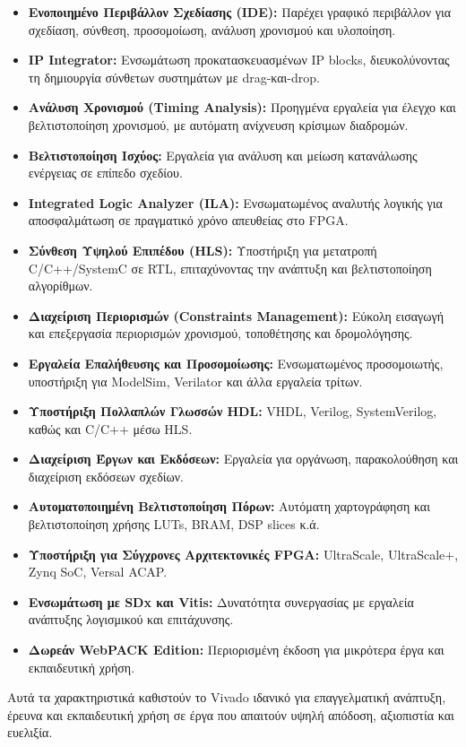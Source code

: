 \begin{itemize}
  \item \textbf{Ενοποιημένο Περιβάλλον Σχεδίασης (IDE):} Παρέχει γραφικό περιβάλλον για σχεδίαση, σύνθεση, προσομοίωση, ανάλυση χρονισμού και υλοποίηση.
  \item \textbf{IP Integrator:} Ενσωμάτωση προκατασκευασμένων IP blocks, διευκολύνοντας τη δημιουργία σύνθετων συστημάτων με drag-και-drop.
  \item \textbf{Ανάλυση Χρονισμού (Timing Analysis):} Προηγμένα εργαλεία για έλεγχο και βελτιστοποίηση χρονισμού, με αυτόματη ανίχνευση κρίσιμων διαδρομών.
  \item \textbf{Βελτιστοποίηση Ισχύος:} Εργαλεία για ανάλυση και μείωση κατανάλωσης ενέργειας σε επίπεδο σχεδίου.
  \item \textbf{Integrated Logic Analyzer (ILA):} Ενσωματωμένος αναλυτής λογικής για αποσφαλμάτωση σε πραγματικό χρόνο απευθείας στο FPGA.
  \item \textbf{Σύνθεση Υψηλού Επιπέδου (HLS):} Υποστήριξη για μετατροπή C/C++/SystemC σε RTL, επιταχύνοντας την ανάπτυξη και βελτιστοποίηση αλγορίθμων.
  \item \textbf{Διαχείριση Περιορισμών (Constraints Management):} Εύκολη εισαγωγή και επεξεργασία περιορισμών χρονισμού, τοποθέτησης και δρομολόγησης.
  \item \textbf{Εργαλεία Επαλήθευσης και Προσομοίωσης:} Ενσωματωμένος προσομοιωτής, υποστήριξη για ModelSim, Verilator και άλλα εργαλεία τρίτων.
  \item \textbf{Υποστήριξη Πολλαπλών Γλωσσών HDL:} VHDL, Verilog, SystemVerilog, καθώς και C/C++ μέσω HLS.
  \item \textbf{Διαχείριση Έργων και Εκδόσεων:} Εργαλεία για οργάνωση, παρακολούθηση και διαχείριση εκδόσεων σχεδίων.
  \item \textbf{Αυτοματοποιημένη Βελτιστοποίηση Πόρων:} Αυτόματη χαρτογράφηση και βελτιστοποίηση χρήσης LUTs, BRAM, DSP slices κ.ά.
  \item \textbf{Υποστήριξη για Σύγχρονες Αρχιτεκτονικές FPGA:} UltraScale, UltraScale+, Zynq SoC, Versal ACAP.
  \item \textbf{Ενσωμάτωση με SDx και Vitis:} Δυνατότητα συνεργασίας με εργαλεία ανάπτυξης λογισμικού και επιτάχυνσης.
  \item \textbf{Δωρεάν WebPACK Edition:} Περιορισμένη έκδοση για μικρότερα έργα και εκπαιδευτική χρήση.
\end{itemize}

Αυτά τα χαρακτηριστικά καθιστούν το Vivado ιδανικό για επαγγελματική ανάπτυξη, έρευνα και εκπαιδευτική χρήση σε έργα που απαιτούν υψηλή απόδοση, αξιοπιστία και ευελιξία.

